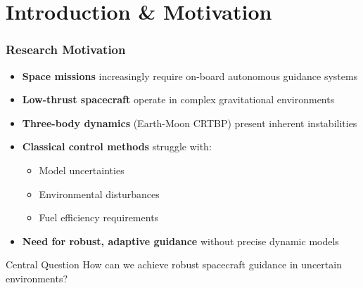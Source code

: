 \section{Introduction \& Motivation}

\begin{frame}
    \frametitle{Research Motivation}
    \vspace{-0.5cm}

    \begin{itemize}
        \item \textbf{Space missions} increasingly require on-board autonomous guidance systems

        \item \textbf{Low-thrust spacecraft} operate in complex gravitational environments
        \item \textbf{Three-body dynamics} (Earth-Moon CRTBP) present inherent instabilities
        \item \textbf{Classical control methods} struggle with:
        \begin{itemize}
            \item Model uncertainties
            \item Environmental disturbances
            \item Fuel efficiency requirements
        \end{itemize}
        \item \textbf{Need for robust, adaptive guidance} without precise dynamic models
    \end{itemize}
    \vspace{-0.1cm}
    
    \begin{minipage}
        {0.83\textwidth}
            \begin{block}{Central Question}
     How can we achieve robust spacecraft guidance in uncertain environments?
    \end{block}
    \end{minipage}
\end{frame}

